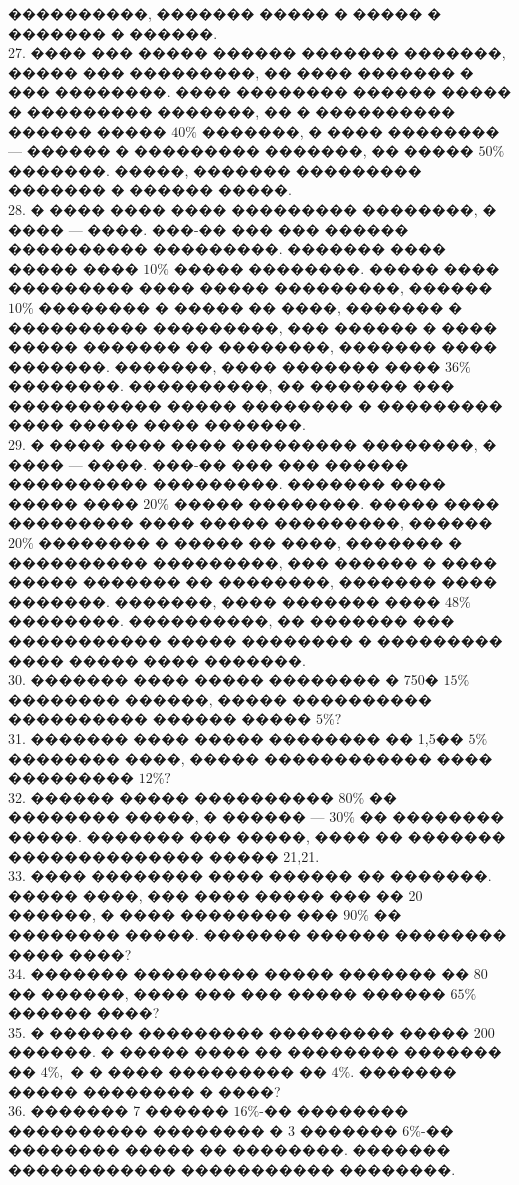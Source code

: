 \documentclass[12pt]{article}
\begin{document}
����������, ������� ����� � ����� � ������� � ������.\\
27. ���� ��� ����� ������ ������� �������, ����� ��� ���������, �� ���� ������� � ��� ��������. ���� �������� ������ ����� � ��������� �������, �� � ���������� ������ �����
$40\%$ �������, � ���� �������� --- ������ � ��������� �������, �� ����� $50\%$ �������. �����, ������� ��������� ������� � ������ �����.\\
28. � ���� ���� ���� ��������� ��������, � ���� --- ����. ���-�� ��� ��� ������ ���������� ���������. ������� ���� ����� ���� $10\%$ ����� ��������. ����� ���� ��������� ���� ����� ���������, ������ $10\%$ �������� � ����� �� ����, ������� � ���������� ���������, ��� ������ � ���� ����� ������� �� ��������, ������� ���� �������. �������, ���� ������� ���� $36\%$ ��������. ����������, �� ������� ��� ����������� ����� �������� � ��������� ���� ����� ���� �������.\\
29. � ���� ���� ���� ��������� ��������, � ���� --- ����. ���-�� ��� ��� ������ ���������� ���������. ������� ���� ����� ���� $20\%$ ����� ��������. ����� ���� ��������� ���� ����� ���������, ������ $20\%$ �������� � ����� �� ����, ������� � ���������� ���������, ��� ������ � ���� ����� ������� �� ��������, ������� ���� �������. �������, ���� ������� ���� $48\%$ ��������. ����������, �� ������� ��� ����������� ����� �������� � ��������� ���� ����� ���� �������.\\
30. ������� ���� ����� �������� � 750� $15\%$ �������� ������, ����� ���������� ���������� ������ ����� $5\%?$\\
31. ������� ���� ����� �������� �� 1,5�� $5\%$ �������� ����, ����� ������������ ���� ��������� $12\%?$\\
32. ������ ����� ���������� $80\%$ �� �������� �����, � ������ --- $30\%$ �� �������� �����. ������� ��� �����, ���� �� ������� �������������� ����� 21,21.\\
33. ���� �������� ���� ������ �� �������. ����� ����, ��� ���� ����� ��� �� 20 ������, � ���� �������� ��� $90\%$ �� �������� �����. ������� ������ �������� ���� ����?\\
34. ������� ��������� ����� ������� �� 80 �� ������, ���� ��� ��� ����� ������ $65\%$ ������ ����?\\
35. � ������ ��������� ��������� ����� 200 ������. � ����� ���� �� �������� ������� �� $4\%,$ � � ���� ��������� �� $4\%.$ ������� ����� �������� � ����?\\
36. ������� 7 ������ $16\%$-�� �������� ���������� �������� � 3 ������� $6\%$-�� �������� ����� �� ��������. ������� ������������ ����������� ��������.\\
\end{document}
